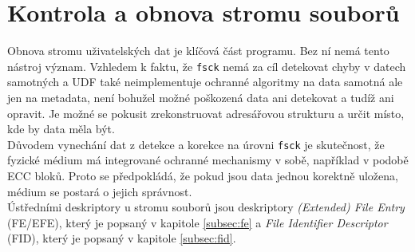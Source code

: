 \section{Kontrola a obnova stromu souborů}
\label{sec:filetree}
Obnova stromu uživatelských dat je klíčová část programu. Bez ní nemá tento nástroj význam. Vzhledem k faktu, že \texttt{fsck} nemá za cíl detekovat chyby v datech samotných a UDF také neimplementuje ochranné algoritmy na data samotná ale jen na metadata, není bohužel možné poškozená data ani detekovat a tudíž ani opravit. Je možné se pokusit zrekonstruovat adresářovou strukturu a určit místo, kde by data měla být.\\
Důvodem vynechání dat z detekce a korekce na úrovni \texttt{fsck} je skutečnost, že fyzické médium má integrované ochranné mechanismy v sobě, například v podobě ECC bloků. Proto se předpokládá, že pokud jsou data jednou korektně uložena, médium se postará o jejich správnost.\\
Ústředními deskriptory u stromu souborů jsou deskriptory \textit{(Extended) File Entry} (FE/EFE), který je popsaný v kapitole \ref{subsec:fe} a \textit{File Identifier Descriptor} (FID), který je popsaný v kapitole \ref{subsec:fid}.\\ 
